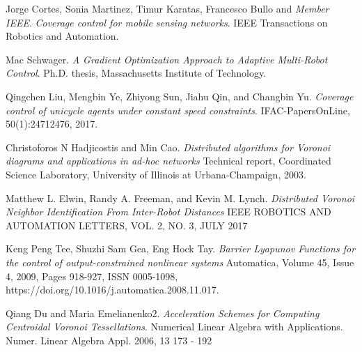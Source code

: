 \documentclass[journal]{IEEEtran}
\begin{document}
	\begin{thebibliography}{1}
		
		Jorge Cortes, Sonia Martinez, Timur Karatas, Francesco Bullo and \textit{Member IEEE}.
		\emph{Coverage control for mobile sensing networks}. 
		IEEE Transactions on Robotics and Automation.
		
		Mac Schwager.
		\emph{A Gradient Optimization Approach to Adaptive Multi-Robot Control}. 
		Ph.D. thesis, Massachusetts Institute of Technology.
		
		
		Qingchen Liu, Mengbin Ye, Zhiyong Sun, Jiahu Qin, and Changbin Yu.
		\emph{Coverage control of unicycle agents under constant speed constraints}. 
		IFAC-PapersOnLine, 50(1):2471{2476, 2017}.
		
		Christoforos N Hadjicostis and Min Cao. \emph{Distributed algorithms for Voronoi diagrams and applications in ad-hoc networks} Technical report, Coordinated Science Laboratory, University of Illinois at Urbana-Champaign, 2003.
		
		Matthew L. Elwin, Randy A. Freeman, and Kevin M. Lynch. \emph{Distributed Voronoi Neighbor Identification From
			Inter-Robot Distances} IEEE ROBOTICS AND AUTOMATION LETTERS, VOL. 2, NO. 3, JULY 2017
		
		Keng Peng Tee, Shuzhi Sam Gea, Eng Hock Tay.
		\emph{Barrier Lyapunov Functions for the control of output-constrained nonlinear systems}
		Automatica, Volume 45, Issue 4, 2009, Pages 918-927, ISSN 0005-1098, https://doi.org/10.1016/j.automatica.2008.11.017.
		
		Qiang Du and Maria Emelianenko2.
		\emph{Acceleration Schemes for Computing Centroidal Voronoi Tessellations}. 
		Numerical Linear Algebra with Applications. Numer. Linear Algebra Appl. 2006, 13 173 - 192
	\end{thebibliography}
	
\end{document}
